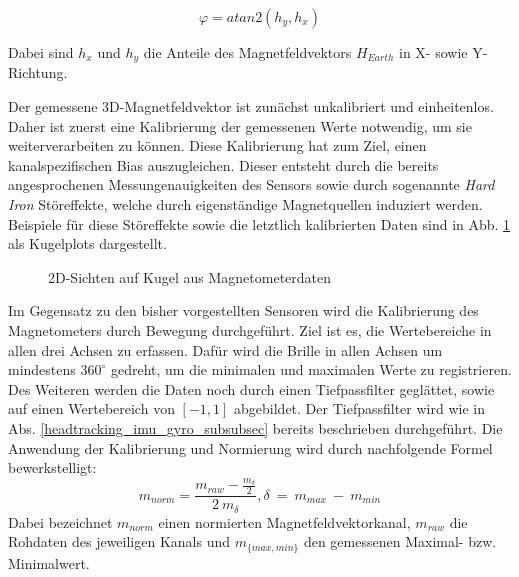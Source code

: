 \begin{equation}
    \varphi = atan2(h_y,h_x)
\end{equation}

Dabei sind $h_x$ und $h_y$ die Anteile des Magnetfeldvektors $H_{Earth}$ in X- sowie Y-Richtung.

Der gemessene 3D-Magnetfeldvektor ist zunächst unkalibriert und einheitenlos.
Daher ist zuerst eine Kalibrierung der gemessenen Werte notwendig, um sie weiterverarbeiten zu können.
Diese Kalibrierung hat zum Ziel, einen kanalspezifischen Bias auszugleichen. 
Dieser entsteht durch die bereits angesprochenen Messungenauigkeiten des Sensors sowie durch sogenannte \textit{Hard Iron} Störeffekte, welche durch eigenständige Magnetquellen induziert werden.
Beispiele für diese Störeffekte sowie die letztlich kalibrierten Daten sind in Abb. \ref{fig:mag_kugel_plots} als Kugelplots dargestellt.

\begin{figure}[ht]
\centering
{}

\caption[]{2D-Sichten auf Kugel aus Magnetometerdaten}
\label{fig:mag_kugel_plots}
\end{figure}

Im Gegensatz zu den bisher vorgestellten Sensoren wird die Kalibrierung des Magnetometers durch Bewegung durchgeführt.
Ziel ist es, die Wertebereiche in allen drei Achsen zu erfassen.
Dafür wird die Brille in allen Achsen um mindestens $360^\circ$ gedreht, um die minimalen und maximalen Werte zu registrieren. 
Des Weiteren werden die Daten noch durch einen Tiefpassfilter geglättet, sowie auf einen Wertebereich von $[-1,1]$ abgebildet.
Der Tiefpassfilter wird wie in Abs. \ref{headtracking_imu_gyro_subsubsec} bereits beschrieben durchgeführt. 
Die Anwendung der Kalibrierung und Normierung wird durch nachfolgende Formel bewerkstelligt:
\begin{equation}
    m_{norm} = \frac{m_{raw}- \frac{m_{\delta}}{2}}{2~m_{\delta}},  {\delta}~=~m_{max}~-~m_{min}
\end{equation}
Dabei bezeichnet $m_{norm}$ einen normierten Magnetfeldvektorkanal, $m_{raw}$ die Rohdaten des jeweiligen Kanals und $m_{\lbrace max, min\rbrace}$ den gemessenen Maximal- bzw. Minimalwert.

